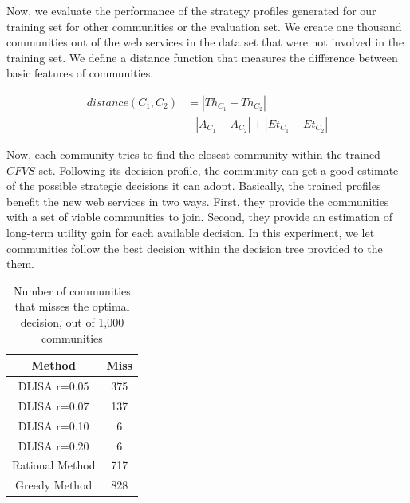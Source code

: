 \documentclass[10pt,journal,cspaper,compsoc]{IEEEtran}
\begin{document}
Now, we evaluate the performance of the strategy profiles generated for our training set for other communities or the evaluation set. We create one thousand communities out of the web services in the data set that were not involved in the training set. We define a distance function that measures the difference between basic features of communities.

\begin{equation}\label{distance_c}
\begin{split}
distance (C_1, C_2) & = |Th_{C_1} - Th_{C_2}| \\
                    & + |A_{C_1} - A_{C_2}| + |Et_{C_1} - Et_{C_2}|
\end{split}
\end{equation}

Now, each community tries to find the closest community within the trained $CFVS$ set. Following its decision profile, the community can get a good estimate of the possible strategic decisions it can adopt. Basically, the trained profiles benefit the new web services in two ways. First, they provide the communities with a set of viable communities to join. Second, they provide an estimation of long-term utility gain for each available decision. In this experiment, we let communities follow the best decision within the decision tree provided to the them. 

\begin{table}[ht]
\caption{Number of communities that misses the optimal decision, out of 1,000 communities} %
\centering %
\begin{tabular}{|c|c|} %
\hline %
 Method&Miss \\ [0.5ex] %
\hline %
 DLISA r=0.05& 375 \\ %
 DLISA r=0.07& 137 \\
 DLISA r=0.10& 6 \\
 DLISA r=0.20& 6 \\
Rational Method& 717 \\
Greedy Method& 828 \\ [1ex] %
\hline %
\end{tabular}
\label{fail_rate} %
\end{table}
\end{document}
